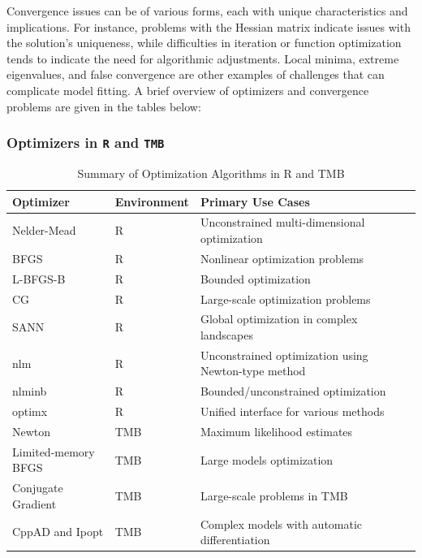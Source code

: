\documentclass[12pt, twoside,hidelinks]{article}
\theoremstyle{definition}
\numberwithin{equation}{section}
\begin{document}
Convergence issues can be of various forms, each with unique characteristics and implications. For instance, problems with the Hessian matrix indicate issues with the solution's uniqueness, while difficulties in iteration or function optimization tends to indicate the need for algorithmic adjustments. Local minima, extreme eigenvalues, and false convergence are other examples of challenges that can complicate model fitting. A brief overview of optimizers and convergence problems are given in the tables below:

\subsubsection{Optimizers in \texttt{R} and \texttt{TMB}}\label{sec:makingsmooth:convergence:optimizers}

\begin{table}[H]
\centering
\begin{tabular}{lll}
\toprule
\textbf{Optimizer} & \textbf{Environment} & \textbf{Primary Use Cases} \\
\midrule
Nelder-Mead & R & Unconstrained multi-dimensional optimization \\
BFGS & R & Nonlinear optimization problems \\
L-BFGS-B & R & Bounded optimization \\
CG & R & Large-scale optimization problems \\
SANN & R & Global optimization in complex landscapes \\
nlm & R & Unconstrained optimization using Newton-type method \\
nlminb & R & Bounded/unconstrained optimization \\
optimx & R & Unified interface for various methods \\
Newton & TMB & Maximum likelihood estimates \\
Limited-memory BFGS & TMB & Large models optimization \\
Conjugate Gradient & TMB & Large-scale problems in TMB \\
CppAD and Ipopt & TMB & Complex models with automatic differentiation \\
\bottomrule
\end{tabular}
\caption{Summary of Optimization Algorithms in R and TMB}
\label{tab:optimizers}
\end{table}
\end{document}
